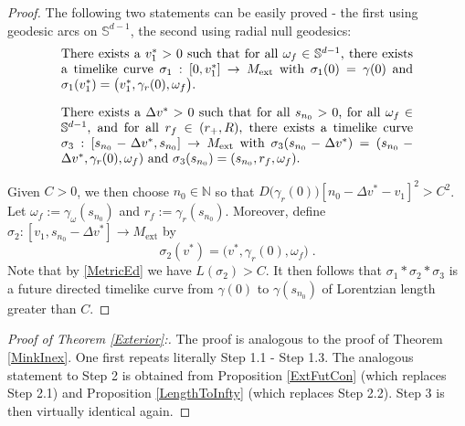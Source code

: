 \documentclass[reqno]{article}
\newcommand{\Sd}{\mathbb{S}^{d-1}}
\newcommand{\Mext}{M_{\mathrm{ext}}}
\begin{document}
\begin{proof}
The following two statements can be easily proved - the first using geodesic arcs on $\Sd$, the second using radial null geodesics:
\begin{equation}
\label{Sphere}
\parbox{0.8\textwidth}{There exists a $v^*_1 >0$ such that for all $\omega_f \in \Sd$, there exists a timelike curve $\sigma_1 : [0, v^*_1] \to \Mext$ with $\sigma_1(0) = \gamma(0)$ and $\sigma_1(v^*_1) = \big(v^*_1, \gamma_r(0), \omega_f\big)$.}
\end{equation}

\begin{equation}
\label{RadialGeod}
\parbox{0.8\textwidth}{There exists a $\Delta v^* >0$ such that for all $s_{n_0} >0$, for all $\omega_f \in \Sd$, and for all $r_f \in (r_+, R)$, there exists a timelike curve $\sigma_3 :[s_{n_0} - \Delta v^*, s_{n_0}] \to \Mext$ with $\sigma_3(s_{n_0} - \Delta v^*) = (s_{n_0} - \Delta v^*, \gamma_r(0), \omega_f)$ and $\sigma_3(s_{n_0}) = (s_{n_0}, r_f, \omega_f)$.}
\end{equation}

Given $C>0$, we then choose $n_0 \in \mathbb{N}$ so that $D\big(\gamma_r(0)\big) [n_0 - \Delta v^* - v_1]^2 > C^2$. Let $\omega_f := \gamma_\omega(s_{n_0})$ and $r_f := \gamma_r(s_{n_0})$. Moreover, define $\sigma_2 : [v_1, s_{n_0} - \Delta v^*] \to \Mext$ by
\begin{equation*}
\sigma_2(v^*) = \big(v^*, \gamma_r(0), \omega_f\big) \;.
\end{equation*}
Note that by \eqref{MetricEd} we have $L(\sigma_2) > C$.
It then follows that $\sigma_1 * \sigma_2 * \sigma_3$ is a future directed timelike curve from $\gamma(0)$ to $\gamma(s_{n_0})$ of Lorentzian length greater than $C$.
\end{proof}


\begin{proof}[Proof of Theorem \ref{Exterior}:]
The proof is analogous to the proof of Theorem \ref{MinkInex}. One first repeats literally Step 1.1 - Step 1.3. The analogous statement to Step 2 is obtained from Proposition \ref{ExtFutCon} (which replaces Step 2.1) and Proposition \ref{LengthToInfty} (which replaces Step 2.2). Step 3 is then virtually identical again.
\end{proof}
\end{document}
